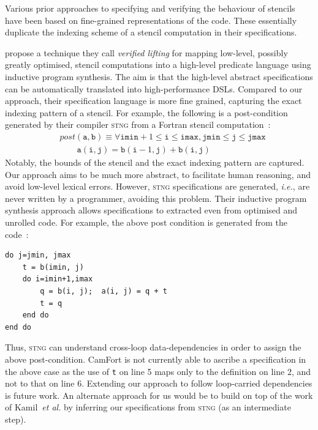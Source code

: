 \documentclass[9pt]{sigplanconf}
\theoremstyle{definition}
\newcommand{\ie}{\emph{i.e.}}
\begin{document}
Various prior approaches to specifying and verifying the behaviour
of stencils have been based on fine-grained representations of the
code. These essentially duplicate the indexing scheme of a stencil
computation in their specifications.

\citet{kamil2016verified} propose a technique they call
\emph{verified lifting} for mapping low-level, possibly
greatly optimised, stencil computations into a high-level
predicate language using inductive program synthesis.
The aim is that the high-level abstract specifications can
be automatically translated into high-performance DSLs. Compared to our approach,
their specification language is more fine grained, capturing
the exact indexing pattern of a stencil. For example, the following
is a post-condition generated by their
compiler \textsc{stng} from a Fortran stencil computation~\cite [p.3]{kamil2016verified}:
%
\begin{align*}
& \textit{post}(\texttt{a}, \texttt{b}) \equiv \forall \texttt{imin}+1
\leq \texttt{i} \leq \texttt{imax}, \texttt{jmin} \leq \texttt{j} \leq
\texttt{jmax} \\
& \qquad \texttt{a}(\texttt{i},\texttt{j}) =
\texttt{b}(\texttt{i}-1,\texttt{j}) + \texttt{b}(\texttt{i},\texttt{j})
\end{align*}
%
Notably, the bounds of the stencil and the exact indexing pattern
are captured. Our approach aims to be much more abstract, to
facilitate human reasoning, and avoid low-level lexical
errors. However, \textsc{stng} specifications are generated, \ie{},
are never written by a programmer, avoiding this
problem. Their inductive program synthesis approach allows
specifications to extracted even from optimised and unrolled code. For
example, the above post condition is generated from the code~\cite [p.3]{kamil2016verified}:
%
\begin{verbatim}
do j=jmin, jmax
    t = b(imin, j)
    do i=imin+1,imax
        q = b(i, j);  a(i, j) = q + t
        t = q
    end do
end do
\end{verbatim}
%
Thus, \textsc{stng} can understand cross-loop data-dependencies
in order to assign the above post-condition. CamFort is not currently
able to ascribe a specification in the above case as the use of
\texttt{t} on line 5 maps only to the definition on line 2, and not to
that on line 6. Extending our approach to follow loop-carried dependencies is
future work. An alternate approach for us would be to build on top of
the work of Kamil~\emph{et al.} by inferring our specifications from
\textsc{stng} (as an intermediate step).
\end{document}
